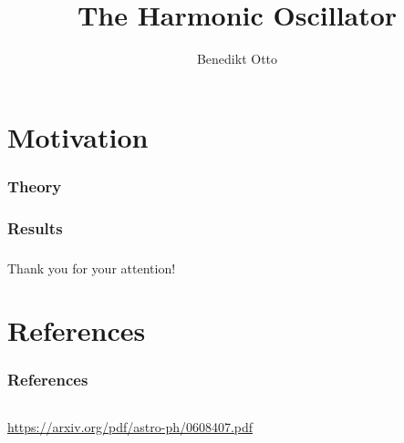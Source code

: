 \documentclass[aspectratio=169]{beamer}
\title[The Harmonic Oscillator]{The Harmonic Oscillator}
\author{Benedikt Otto}
\date{\printdate{24.03.2020}} %
\institute{Computational Physics}
\begin{document}
\begin{frame}
	\titlepage
\end{frame}


\section{Motivation}
\begin{frame}

\end{frame}

\begin{frame}
\frametitle{Theory}

\end{frame}

\begin{frame}
\frametitle{Results}

\end{frame}


\begin{frame}
\frametitle{}
\begin{center}
	Thank you for your attention!
\end{center}
\end{frame}

\section{References}
\begin{frame}
\frametitle{References}
\vspace{-20px}
\begin{columns}[T]
	\begin{column}{0.35\textwidth}
		\begin{tiny}
			\begin{thebibliography}{99}
				\fontsize{6}{6}
				\url{https://arxiv.org/pdf/astro-ph/0608407.pdf}
			\end{thebibliography}
		\end{tiny}
	\end{column}
\end{columns}
\end{frame}



\appendixstyle

\appendix
\end{document}
